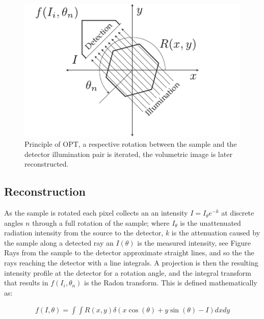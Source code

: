 \begin{figure}
  \centering
  \includegraphics{Chapters/flopt/Figs/PDF/OPT_digram}
  \caption{Principle of OPT, a respective rotation between the sample and the detector illumination pair is iterated, the volumetric image is later reconstructed.}
  \label{fig:OPT_digram}
\end{figure}

\subsection{Reconstruction}

As the sample is rotated each pixel collects an an intensity $I = I_{\theta}e^{-k}$ at discrete angles $n$ through a full rotation of the sample; where $I_{\theta}$ is the unattenuated radiation intensity from the source to the detector, $k$ is the attenuation caused by the sample along a detected ray an $I(\theta)$ is the measured intensity, see Figure %
Rays from the sample to the detector approximate straight lines, and so the the rays reaching the detector with a line integrals.
A projection is then the resulting intensity profile at the detector for a rotation angle, and the integral transform that results in $f(I_i,\theta_n)$ is the Radon transform.
This is defined mathematically as:

\begin{align}
    f(I,\theta) = \int \int R(x,y)\delta (x\cos(\theta)+y \sin(\theta)-I)dx dy
\end{align}

